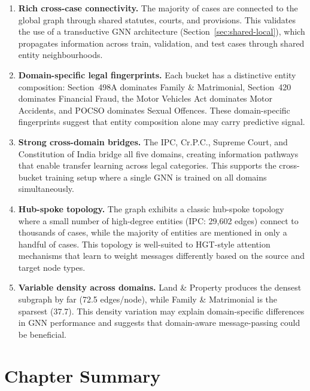 \begin{enumerate}
    \item \textbf{Rich cross-case connectivity.} The majority of cases are connected to the global graph through shared statutes, courts, and provisions. This validates the use of a transductive GNN architecture (Section~\ref{sec:shared-local}), which propagates information across train, validation, and test cases through shared entity neighbourhoods.

    \item \textbf{Domain-specific legal fingerprints.} Each bucket has a distinctive entity composition: Section~498A dominates Family \& Matrimonial, Section~420 dominates Financial Fraud, the Motor Vehicles Act dominates Motor Accidents, and POCSO dominates Sexual Offences. These domain-specific fingerprints suggest that entity composition alone may carry predictive signal.

    \item \textbf{Strong cross-domain bridges.} The IPC, Cr.P.C., Supreme Court, and Constitution of India bridge all five domains, creating information pathways that enable transfer learning across legal categories. This supports the cross-bucket training setup where a single GNN is trained on all domains simultaneously.

    \item \textbf{Hub-spoke topology.} The graph exhibits a classic hub-spoke topology where a small number of high-degree entities (IPC: 29,602 edges) connect to thousands of cases, while the majority of entities are mentioned in only a handful of cases. This topology is well-suited to HGT-style attention mechanisms that learn to weight messages differently based on the source and target node types.

    \item \textbf{Variable density across domains.} Land \& Property produces the densest subgraph by far (72.5 edges/node), while Family \& Matrimonial is the sparsest (37.7). This density variation may explain domain-specific differences in GNN performance and suggests that domain-aware message-passing could be beneficial.
\end{enumerate}

\section{Chapter Summary}
\label{sec:ch6-summary}

